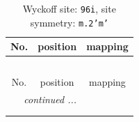 \documentclass[fleqn,8pt]{jsarticle}
\begin{document}
\renewcommand{\arraystretch}{1.2}
\begin{longtable}{ccc}
\caption{Wyckoff site: {\tt 96i}, site symmetry: {\tt m.2'm'}}
 \\
 \hline \hline
No. & position & mapping \\ \hline \endfirsthead

\multicolumn{2}{l}{\tablename\ \thetable{}} \\
 \hline \hline
No. & position & mapping \\ \hline \endhead

 \hline \hline
\multicolumn{2}{r}{\footnotesize\it continued ...} \\ \endfoot

 \hline \hline
\multicolumn{2}{r}{} \\ \endlastfoot


\end{longtable}
\end{document}

